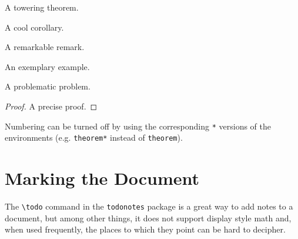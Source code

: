 \documentclass[10pt,letterpaper]{amsart}
\begin{document}
\begin{theorem}
  A towering theorem. 
\end{theorem}

\begin{corollary}
  A cool corollary. 
\end{corollary}

\begin{remark}
  A remarkable remark. 
\end{remark}

\begin{example}
  An exemplary example. 
\end{example}

\begin{problem}
  A problematic problem. 
\end{problem}

\begin{proof}
  A precise proof.
\end{proof}

Numbering can be turned off by using the corresponding \verb|*| versions of the environments (e.g. \verb|theorem*| instead of \verb|theorem|). 

\section{Marking the Document}
\label{sec:marking}
The \verb|\todo| command in the \verb|todonotes| package is a great way to add notes to a document, but among other things, it does not support display style math and, when used frequently, the places to which they point can be hard to decipher. 
\end{document}
